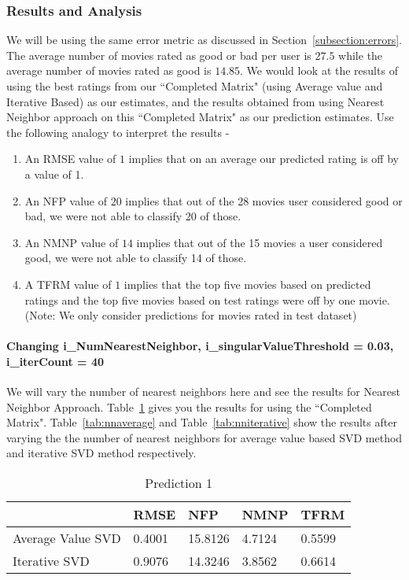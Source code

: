 \subsubsection{Results and Analysis}
We will be using the same error metric as discussed in Section~\ref{subsection:errors}. The average number of movies rated as good or bad per user is $27.5$ while the average number of movies rated as good is $14.85$. We would look at the results of using the best ratings from our ``Completed Matrix" (using Average value and Iterative Based) as our estimates, and the results obtained from using Nearest Neighbor approach on this ``Completed Matrix" as our prediction estimates. Use the following analogy to interpret the results -
\begin{enumerate}
\item An RMSE value of $1$ implies that on an average our predicted rating is off by a value of 1.
\item An NFP value of $20$ implies that out of the 28 movies user considered good or bad, we were not able to classify 20 of those.
\item An NMNP value of $14$ implies that out of the 15 movies a user considered good, we were not able to classify 14 of those.
\item A TFRM value of $1$ implies that the top five movies based on predicted ratings and the top five movies based on test ratings were off by one movie. (Note: We only consider predictions for movies rated in test dataset)
\end{enumerate}

\paragraph{Changing i\_NumNearestNeighbor, i\_singularValueThreshold = 0.03, i\_iterCount = 40}
We will vary the number of nearest neighbors here and see the results for Nearest Neighbor Approach. Table~\ref{tab:prediction} gives you the results for using the ``Completed Matrix". Table~\ref{tab:nnaverage} and Table~\ref{tab:nniterative} show the results after varying the the number of nearest neighbors for average value based SVD method and iterative SVD method respectively.
\begin{table}[]
\centering
\caption{Prediction 1}
\label{tab:prediction}
\begin{tabular}{|l|l|l|l|l|}
\hline
                  & RMSE   & NFP     & NMNP   & TFRM   \\ \hline
Average Value SVD & 0.4001 & 15.8126 & 4.7124 & 0.5599 \\ \hline
Iterative SVD     & 0.9076 & 14.3246 & 3.8562 & 0.6614 \\ \hline
\end{tabular}
\end{table}

